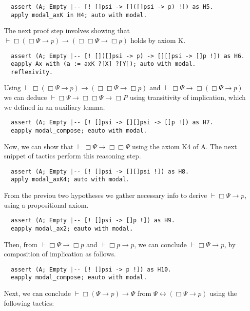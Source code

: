 \documentclass[3p,times]{elsarticle}
\begin{document}
\begin{verbatim}
  assert (A; Empty |-- [! []psi -> []([]psi -> p) !]) as H5.
  apply modal_axK in H4; auto with modal.
\end{verbatim}

\noindent The next proof step involves showing that
$\vdash \Box (\Box \Psi \to p)\to (\Box \Box \Psi \to \Box p)$ holds
by axiom K.

\begin{verbatim}
  assert (A; Empty |-- [! []([]psi -> p) -> [][]psi -> []p !]) as H6.
  eapply Ax with (a := axK ?[X] ?[Y]); auto with modal.
  reflexivity.
\end{verbatim}

\noindent Using $\vdash \Box (\Box \Psi \to p)\to (\Box \Box \Psi \to \Box p)$ and
$\vdash \Box \Psi \to\Box (\Box \Psi \to p)$ we can deduce
$\vdash \Box \Psi \to \Box \Box \Psi \to \Box P$ using transitivity of
implication,
which we defined in an auxiliary lemma.

\begin{verbatim}
  assert (A; Empty |-- [! []psi -> [][]psi -> []p !]) as H7.
  eapply modal_compose; eauto with modal.
\end{verbatim}

\noindent Now, we can show that $\vdash\Box\Psi\to\Box\Box\Psi$ using
the axiom K4 of A. The next snippet of tactics perform this
reasoning step.

\begin{verbatim}
  assert (A; Empty |-- [! []psi -> [][]psi !]) as H8.
  apply modal_axK4; auto with modal.
\end{verbatim}

\noindent From the previou two hypotheses we gather necessary info to derive
$\vdash \Box \Psi \to p$, using a propositional axiom.

\begin{verbatim}
  assert (A; Empty |-- [! []psi -> []p !]) as H9.
  eapply modal_ax2; eauto with modal.
\end{verbatim}

\noindent Then, from $\vdash \Box\Psi \to \Box p$ and $\vdash \Box p \to p$, we can
conclude $\vdash \Box \Psi \to p$, by composition of implication as
follows.

\begin{verbatim}
  assert (A; Empty |-- [! []psi -> p !]) as H10.
  eapply modal_compose; eauto with modal.
\end{verbatim}

\noindent Next, we can conclude $\vdash \Box (\Psi \to p) \to \Psi$ from
$\Psi \leftrightarrow (\Box \Psi \to p)$ using
the following tactics:
\end{document}
